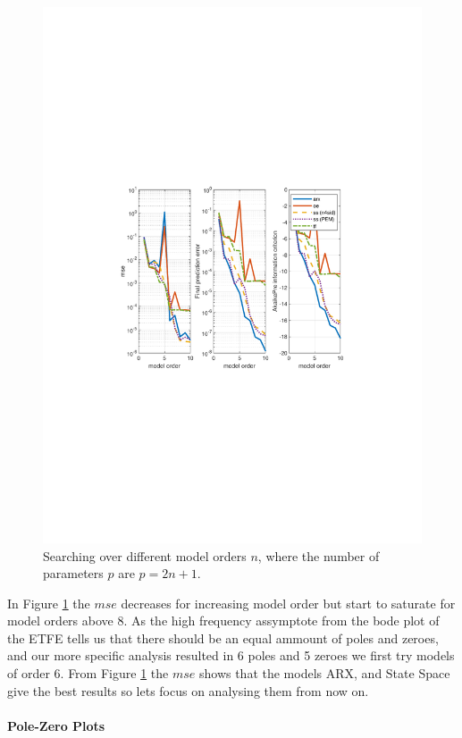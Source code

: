 \documentclass[]{article}
\begin{document}
\begin{figure}[ht]
\centering
\includegraphics[trim= 10cm 8cm 10cm 8cm, scale=0.7]{figures/model_order.pdf}
\caption{Searching over different model orders $n$, where the number of parameters $p$ are $p=2n+1$.}
\label{fig:model_order}
\end{figure}
In Figure \ref{fig:model_order} the $mse$ decreases for increasing model order but start to saturate for model orders above 8. As the high frequency assymptote from the bode plot of the ETFE tells us that there should be an equal ammount of poles and zeroes, and our more specific analysis resulted in 6 poles and 5 zeroes we first try models of order 6. From Figure \ref{fig:model_order} the $mse$ shows that the models ARX, and State Space give the best results so lets focus on analysing them from now on.

\paragraph{Pole-Zero Plots}
\end{document}
